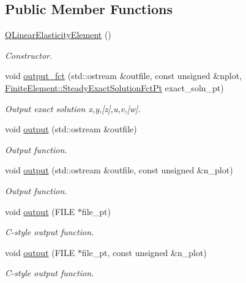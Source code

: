 \subsection*{Public Member Functions}
\begin{DoxyCompactItemize}
\item 
\hyperlink{classoomph_1_1QLinearElasticityElement_a51d460f236a3501e32bc2218877707fd}{Q\+Linear\+Elasticity\+Element} ()
\begin{DoxyCompactList}\small\item\em Constructor. \end{DoxyCompactList}\item 
void \hyperlink{classoomph_1_1QLinearElasticityElement_a6f391511c442ee1ead6260df2e559c7e}{output\+\_\+fct} (std\+::ostream \&outfile, const unsigned \&nplot, \hyperlink{classoomph_1_1FiniteElement_a690fd33af26cc3e84f39bba6d5a85202}{Finite\+Element\+::\+Steady\+Exact\+Solution\+Fct\+Pt} exact\+\_\+soln\+\_\+pt)
\begin{DoxyCompactList}\small\item\em Output exact solution x,y,\mbox{[}z\mbox{]},u,v,\mbox{[}w\mbox{]}. \end{DoxyCompactList}\item 
void \hyperlink{classoomph_1_1QLinearElasticityElement_ab5746a722f2c015ceaace3afce89d797}{output} (std\+::ostream \&outfile)
\begin{DoxyCompactList}\small\item\em Output function. \end{DoxyCompactList}\item 
void \hyperlink{classoomph_1_1QLinearElasticityElement_a60eeaa0b23deb65a39b2d5bd41540963}{output} (std\+::ostream \&outfile, const unsigned \&n\+\_\+plot)
\begin{DoxyCompactList}\small\item\em Output function. \end{DoxyCompactList}\item 
void \hyperlink{classoomph_1_1QLinearElasticityElement_a16db5e5ba60abbb8b79e1fce0ebd892e}{output} (F\+I\+LE $\ast$file\+\_\+pt)
\begin{DoxyCompactList}\small\item\em C-\/style output function. \end{DoxyCompactList}\item 
void \hyperlink{classoomph_1_1QLinearElasticityElement_a0463c6394c7ef11cef70e036e8845743}{output} (F\+I\+LE $\ast$file\+\_\+pt, const unsigned \&n\+\_\+plot)
\begin{DoxyCompactList}\small\item\em C-\/style output function. \end{DoxyCompactList}\end{DoxyCompactItemize}

